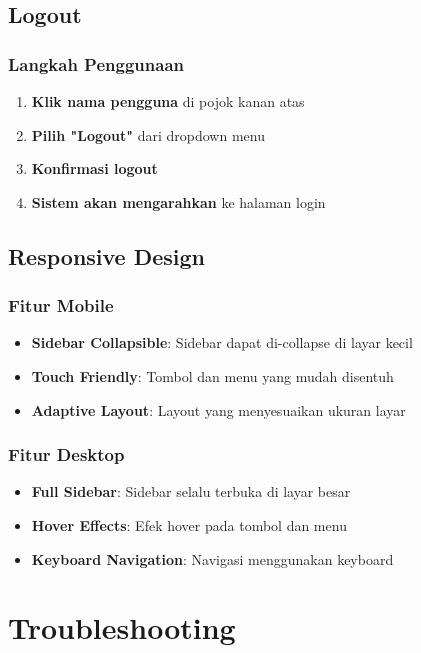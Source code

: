\documentclass[12pt,a4paper]{article}
\begin{document}
\subsection{Logout}

\subsubsection{Langkah Penggunaan}
\begin{enumerate}
    \item \textbf{Klik nama pengguna} di pojok kanan atas
    \item \textbf{Pilih "Logout"} dari dropdown menu
    \item \textbf{Konfirmasi logout}
    \item \textbf{Sistem akan mengarahkan} ke halaman login
\end{enumerate}

\subsection{Responsive Design}

\subsubsection{Fitur Mobile}
\begin{itemize}
    \item \textbf{Sidebar Collapsible}: Sidebar dapat di-collapse di layar kecil
    \item \textbf{Touch Friendly}: Tombol dan menu yang mudah disentuh
    \item \textbf{Adaptive Layout}: Layout yang menyesuaikan ukuran layar
\end{itemize}

\subsubsection{Fitur Desktop}
\begin{itemize}
    \item \textbf{Full Sidebar}: Sidebar selalu terbuka di layar besar
    \item \textbf{Hover Effects}: Efek hover pada tombol dan menu
    \item \textbf{Keyboard Navigation}: Navigasi menggunakan keyboard
\end{itemize}

\newpage

\section{Troubleshooting}
\end{document}
